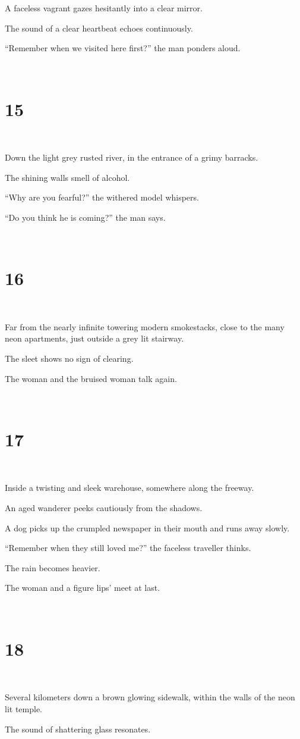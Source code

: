 \documentclass{report}
\begin{document}
A faceless vagrant gazes hesitantly into a clear mirror.

The sound of a clear heartbeat echoes continuously.

``Remember when we visited here first?'' the man ponders aloud.

~
\chapter*{15}
~

Down the light grey rusted river, in the entrance of a grimy barracks.

The shining walls smell of alcohol.

``Why are you fearful?'' the withered model whispers.

``Do you think he is coming?'' the man says.

~
\chapter*{16}
~

Far from the nearly infinite towering modern smokestacks, close to the many neon apartments, just outside a grey lit stairway.

The sleet shows no sign of clearing.

The woman and the bruised woman talk again.

~
\chapter*{17}
~

Inside a twisting and sleek warehouse, somewhere along the freeway.

An aged wanderer peeks cautiously from the shadows.

A dog picks up the crumpled newspaper in their mouth and runs away slowly.

``Remember when they still loved me?'' the faceless traveller thinks.

The rain becomes heavier.

The woman and a figure lips' meet at last.

~
\chapter*{18}
~

Several kilometers down a brown glowing sidewalk, within the walls of the neon lit temple.

The sound of shattering glass resonates.
\end{document}
